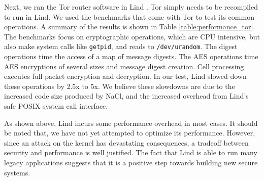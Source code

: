 Next, we ran the Tor router software in Lind . Tor simply
needs to be recompiled to run in Lind.
We used the benchmarks that come with Tor to test its common operations.
A summary of the results is shown in Table \ref{table:performance_tor}. The
benchmarks focus on cryptographic operations,
which are CPU intensive, but also make system calls like \texttt{getpid}, and reads to
\texttt{/dev/urandom}.
The digest operations time the access of a map of message digests.
The AES operations time AES encryptions of several sizes and message
digest creation.
Cell processing executes full packet encryption and decryption. In our
test, Lind slowed down these operations by 2.5x to 5x. We believe these
slowdowns are due to the increased code size produced by NaCl,
and the
increased overhead from Lind's safe POSIX system call interface.

As shown above,  Lind incurs some performance overhead in most cases.
It should be noted that, we have not  yet attempted to optimize its performance.
However, since an attack on the kernel has devastating
consequences, %
a tradeoff between security and performance is well justified.
The fact that Lind is able to run many  legacy applications
suggests that it
is a positive step towards building new secure systems.


